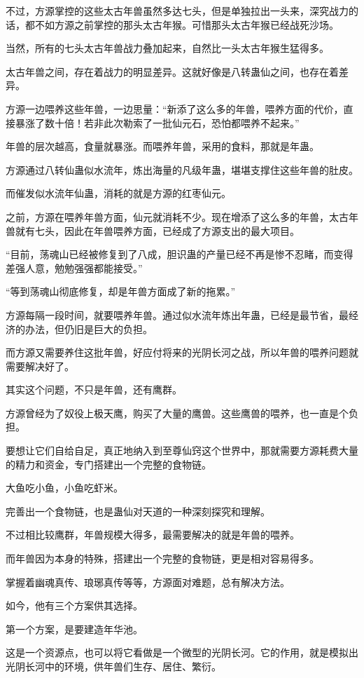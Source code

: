 \begin{this_body}
不过，方源掌控的这些太古年兽虽然多达七头，但是单独拉出一头来，深究战力的话，都不如方源之前掌控的那头太古年猴。可惜那头太古年猴已经战死沙场。

当然，所有的七头太古年兽战力叠加起来，自然比一头太古年猴生猛得多。

太古年兽之间，存在着战力的明显差异。这就好像是八转蛊仙之间，也存在着差异。

方源一边喂养这些年兽，一边思量：“新添了这么多的年兽，喂养方面的代价，直接暴涨了数十倍！若非此次勒索了一批仙元石，恐怕都喂养不起来。”

年兽的层次越高，食量就暴涨。而喂养年兽，采用的食料，那就是年蛊。

方源通过八转仙蛊似水流年，炼出海量的凡级年蛊，堪堪支撑住这些年兽的肚皮。

而催发似水流年仙蛊，消耗的就是方源的红枣仙元。

之前，方源在喂养年兽方面，仙元就消耗不少。现在增添了这么多的年兽，太古年兽就有七头，因此在年兽喂养方面，已经成了方源支出的最大项目。

“目前，荡魂山已经被修复到了八成，胆识蛊的产量已经不再是惨不忍睹，而变得差强人意，勉勉强强都能接受。”

“等到荡魂山彻底修复，却是年兽方面成了新的拖累。”

方源每隔一段时间，就要喂养年兽。通过似水流年炼出年蛊，已经是最节省，最经济的办法，但仍旧是巨大的负担。

而方源又需要养住这批年兽，好应付将来的光阴长河之战，所以年兽的喂养问题就需要解决好了。

其实这个问题，不只是年兽，还有鹰群。

方源曾经为了奴役上极天鹰，购买了大量的鹰兽。这些鹰兽的喂养，也一直是个负担。

要想让它们自给自足，真正地纳入到至尊仙窍这个世界中，那就需要方源耗费大量的精力和资金，专门搭建出一个完整的食物链。

大鱼吃小鱼，小鱼吃虾米。

完善出一个食物链，也是蛊仙对天道的一种深刻探究和理解。

不过相比较鹰群，年兽规模大得多，最需要解决的就是年兽的喂养。

而年兽因为本身的特殊，搭建出一个完整的食物链，更是相对容易得多。

掌握着幽魂真传、琅琊真传等等，方源面对难题，总有解决方法。

如今，他有三个方案供其选择。

第一个方案，是要建造年华池。

这是一个资源点，也可以将它看做是一个微型的光阴长河。它的作用，就是模拟出光阴长河中的环境，供年兽们生存、居住、繁衍。


\end{this_body}
